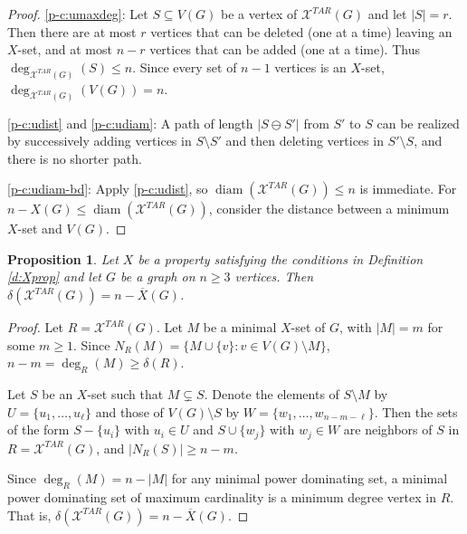 \documentclass{article}
\numberwithin{figure}{section}   %
\newtheorem{prop}[thm]{Proposition}
\theoremstyle{definition}
\theoremstyle{definition}
\theoremstyle{definition}
\newcommand{\ol}{\overline}
\newcommand{\bpf}{\begin{proof}}
\newcommand{\epf}{\end{proof}\ms}
\newcommand{\ms}{\medskip}
\newcommand{\diam}{\operatorname{diam}}
\newcommand{\xbar}{\ol X}
\newcommand{\xtar}{\mathscr{X}^{TAR}}
\newcommand{\df}[1]{{\textcolor{red}{[}\textcolor{red}{{DF: \em #1}]}}}
\begin{document}

\bpf \eqref{p-c:umaxdeg}:  
Let $S\subseteq V(G)$ be a vertex of $\xtar(G)$ and let $|S|=r$. Then there are at most $r$ vertices that can be deleted (one at a time) leaving an $X$-set, and at most $n-r$ vertices that can be added (one at a time).  Thus $\deg_{\xtar(G)}(S)\le n$.  Since every set of $n-1$ vertices is an $X$-set, $\deg_{\xtar(G)}(V(G))= n$.

\eqref{p-c:udist} and \eqref{p-c:udiam}: A path of length $|S\ominus S'|$ from $S'$ to $S$ can be realized by successively adding vertices in $S\setminus S'$ and then deleting vertices in $ S'\setminus S$, and there is no shorter path.  

\eqref{p-c:udiam-bd}: Apply \eqref{p-c:udist}, so $\diam(\xtar(G))\leq n$ is immediate. For $n-X(G)\le \diam(\xtar(G))$,  consider the distance between a minimum $X$-set and $V(G)$.   
\epf

 \begin{prop}\label{p:umindegreeTAR}
Let $X$ be a property satisfying the conditions in Definition \ref{d:Xprop} and let $G$ be a graph on $n\geq3$ vertices. %
Then  $\delta(\xtar(G))=n-\xbar(G)$.
\end{prop}

\bpf
Let %
$R=\xtar(G)$.   Let $M$ be a minimal $X$-set of $G$, with $|M|=m$ for some $m\geq 1$.  Since $N_R(M)=\{M \cup \{v\}: v \in V(G)\setminus M\}$,  $n-m=\deg_R(M)\ge \delta(R)$. 

Let $S$ be an $X$-set such that $M \subsetneq S$. Denote the elements of $S\setminus M$ by $U= \{u_1,\ldots,u_\ell\} $ and those of  $V(G)\setminus S$ by $W=\{w_1,\ldots, w_{n-m-\ell} \}$. Then the sets of the form $S-\{u_i\}$ with $u_i \in U$ and $S \cup  \{w_j\}$ with $w_j \in W$ are neighbors of $S$ in $R=\xtar(G)$, and $|N_R(S)| \geq n-m$. 

Since $\deg_R(M) = n-|M|$ for any minimal power dominating set, a minimal power dominating set of maximum cardinality is a minimum degree vertex in $R$.  That is, $\delta(\xtar(G)) = n - \xbar(G)$.
\epf
\end{document}
